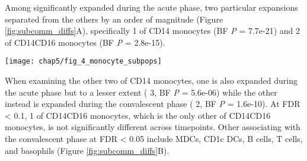 Among \subcommunities{} significantly expanded during the acute phase, two particular expansions separated from the others by an order of magnitude (Figure \ref{fig:subcomm_diffs}A), specifically \subcommunity{} 1 of CD14\sups{+} monocytes (BF \emph{P} = 7.7e-21) and \subcommunity{} 2 of CD14\sups{+}\allowbreak CD16\sups{+} monocytes (BF \emph{P} = 2.8e-15).
\begin{figure*}[htb]
  \centering
  \texttt{[image: chap5/fig\_4\_monocyte\_subpops]}
  \caption[Marker expression differences between sub-communities of CD14\sups{+}CD16\sups{+} monocytes and CD14\sups{+} monocytes]{
  \textbf{Marker expression differences between sub-communities of CD14\sups{+}CD16\sups{+} monocytes and CD14\sups{+} monocytes}, depicted as boxplots of the mean expression levels for all samples. A, relative expression of CD14\sups{+} and CD16\sups{+} in CD14\sups{+}CD16\sups{+} sub-communities indicates that sub-community 1 is a CD14\sups{+}CD16\sups{++} (aka “non-classical”) phenotype, while sub-community 2 is a CD14\sups{++}CD16\sups{+} (aka “intermediate”) phenotype. Differences shown here are significant at FDR < 0.05; for a view of all differences significant at this threshold, see Figure \ref{fig:cd14cd16_channel_diffs}. B, relative expression of six markers that most differentiate (by the difference in medians) sub-community 1 of CD14\sups{+} monocytes from the other sub-communities. C, relative expression of six markers that most differentiate (by the difference in medians) sub-community 3 of CD14\sups{+} monocytes from the other sub-communities. Note: Channels shown in B and C are a subset of the differences that are significant at FDR < 0.05; for a view of all differences significant at FDR < 0.05 see Fig S6.
  }
  \label{fig:subcomm_marker_diffs}
\end{figure*}
When examining the other two \subcommunities{} of CD14\sups{+} monocytes, one is also expanded during the acute phase but to a lesser extent (\subcommunity{} 3, BF \emph{P} = 5.6e-06) while the other instead is expanded during the convalescent phase (\subcommunity{} 2, BF \emph{P} = 1.6e-10). At FDR < 0.1, \subcommunity{} 1 of CD14\sups{+}\allowbreak CD16\sups{+} monocytes, which is the only other \subcommunity{} of CD14\sups{+}\allowbreak CD16\sups{+} monocytes, is not significantly different across timepoints. Other \subcommunities{} associating with the convalescent phase at FDR < 0.05 include MDCs, CD1c DCs, B cells, T cells, and basophils (Figure \ref{fig:subcomm_diffs}B).

